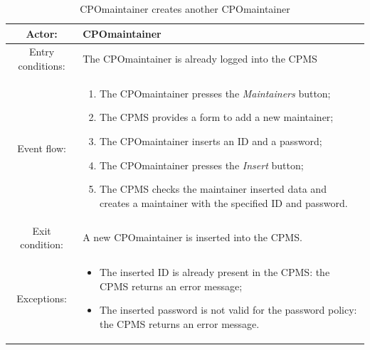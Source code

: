 \begin{table}[h]
    \begin{center}
        \begin{tabular}{|c||p{10cm}|}
            \hline
            Actor:            & \ac{CPO}maintainer                                          \\
            \hline
            Entry conditions: & The \ac{CPO}maintainer is already logged into the \ac{CPMS} \\
            \hline
            Event flow:       &
            \begin{enumerate}
                \item The \ac{CPO}maintainer presses the \textit{Maintainers} button;
                \item The \ac{CPMS} provides a form to add a new maintainer;
                \item The \ac{CPO}maintainer inserts an ID and a password;
                \item The \ac{CPO}maintainer presses the \textit{Insert} button;
                \item The \ac{CPMS} checks the maintainer inserted data and creates a maintainer with the specified ID and password.
            \end{enumerate}
            \\
            \hline
            Exit condition:   & A new \ac{CPO}maintainer is inserted into the \ac{CPMS}.    \\
            \hline
            Exceptions:       &
            \begin{itemize}
                \item The inserted ID is already present in the \ac{CPMS}: the \ac{CPMS} returns an error message;
                \item The inserted password is not valid for the password policy: the \ac{CPMS} returns an error message.
            \end{itemize}
            \\
            \hline
        \end{tabular}
    \end{center}
    \caption{\ac{CPO}maintainer creates another \ac{CPO}maintainer}
\end{table}

